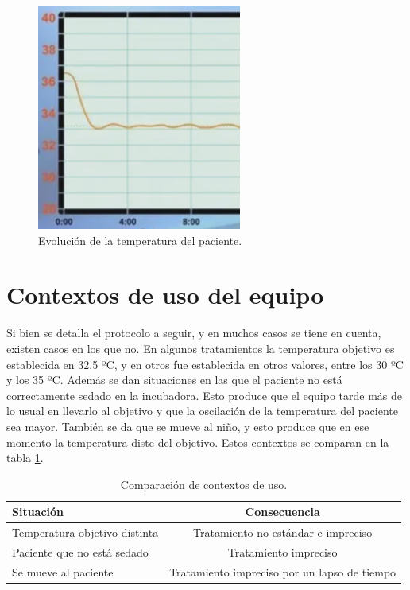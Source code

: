 \begin{figure}[h]
	\centering
	\includegraphics[width=0.6\textwidth]{./Figures/recorte-equipo.png}
	\caption{Evolución de la temperatura del paciente.}
	\label{fig:recorte-equipo}
\end{figure}

\newpage
\section{Contextos de uso del equipo}

Si bien se detalla el protocolo a seguir, y en muchos casos se tiene en cuenta, existen casos en los que no. En algunos tratamientos la temperatura objetivo es establecida en 32.5 ºC, y en otros fue establecida en otros valores, entre los 30 ºC y los 35 ºC. Además se dan situaciones en las que el paciente no está correctamente sedado en la incubadora. Esto produce que el equipo tarde más de lo usual en llevarlo al objetivo y que la oscilación de la temperatura del paciente sea mayor. También se da que se mueve al niño, y esto produce que en ese momento la temperatura diste del objetivo. Estos contextos se comparan en la tabla \ref{tab:contextos-uso}. 

\begin{table}[h]
	\centering
	\caption[Contextos de uso]{Comparación de contextos de uso.}
	\begin{tabular}{l c}  
		\toprule
		\textbf{Situación} 	 & \textbf{Consecuencia}  \\
		\midrule
		Temperatura objetivo distinta & Tratamiento no estándar e impreciso \\		
		Paciente que no está sedado  & Tratamiento impreciso  \\
		Se mueve al paciente & Tratamiento impreciso por un lapso de tiempo \\		
		\bottomrule
		\hline
	\end{tabular}
	\label{tab:contextos-uso}
\end{table}


